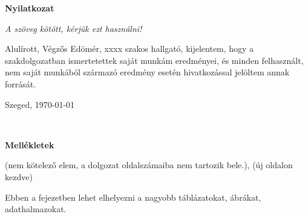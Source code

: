 \documentclass[a4paper,12pt]{report}
\theoremstyle{definition}
\theoremstyle{remark}
\begin{document}
\newpage
{\Huge \bf Nyilatkozat}


\vspace{2 cm}

{\it A szöveg kötött, kérjük ezt használni!}

Alulírott, Végzős Edömér, xxxx szakos hallgató, kijelentem, hogy a szakdolgozatban ismertetettek saját munkám eredményei, és minden felhasznált, nem saját munkából származó eredmény esetén hivatkozással jelöltem annak forrását. 


\begin{flushleft}
\vspace*{1cm}
Szeged, \today
\end{flushleft}

\begin{flushright}
 \vspace*{1cm}
 \makebox[7cm]{\rule{6cm}{.4pt}}\\
\end{flushright}

\pagebreak

\newpage
{\Huge \bf Mellékletek}


\vspace{2 cm}

(nem kötelező elem, a dolgozat oldalszámaiba nem tartozik bele.), (új oldalon kezdve)

Ebben a fejezetben lehet elhelyezni a nagyobb táblázatokat, ábrákat, adathalmazokat.
\end{document}
